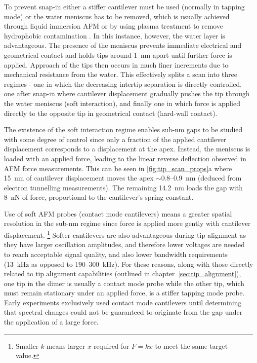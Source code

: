 \documentclass[a4paper]{article}
\begin{document}
To prevent snap-in either a stiffer cantilever must be used (normally in tapping mode) \cite{zhong1993fractured} or the water meniscus has to be removed, which is usually achieved through liquid immersion AFM \cite{hansma1994tapping, putman1994tapping, song2014} or by using plasma treatment to remove hydrophobic contamination \cite{song2014}. In this instance, however, the water layer is advantageous. The presence of the meniscus prevents immediate electrical and geometrical contact and holds tips around \SI{1}{nm} apart until further force is applied. Approach of the tips then occurs in much finer increments due to mechanical resistance from the water. This effectively splits a scan into three regimes - one in which the decreasing intertip separation is directly controlled, one after snap-in where cantilever displacement gradually pushes the tip through the water meniscus (soft interaction), and finally one in which force is applied directly to the opposite tip in geometrical contact (hard-wall contact).

The existence of the soft interaction regime enables sub-nm gaps to be studied with some degree of control since only a fraction of the applied cantilever displacement corresponds to a displacement at the apex. Instead, the meniscus is loaded with an applied force, leading to the linear reverse deflection observed in AFM force measurements. This can be seen in \autoref{fig:tip_scan_props}a where \SI{15}{nm} of cantilever displacement moves the apex $\sim$0.8--\SI{0.9}{nm} (deduced from electron tunnelling measurements). The remaining \SI{14.2}{nm} loads the gap with \SI{8}{nN} of force, proportional to the cantilever's spring constant.

Use of soft AFM probes (contact mode cantilevers) means a greater spatial resolution in the sub-nm regime since force is applied more gently with cantilever displacement.%
\footnote{Smaller $k$ means larger $x$ required for $F=kx$ to meet the same target value.}
Softer cantilevers are also advantageous during tip alignment as they have larger oscillation amplitudes, and therefore lower voltages are needed to reach acceptable signal quality, and also lower bandwidth requirements (\SI{13}{kHz} as opposed to 190--\SI{300}{kHz}).
For these reasons, along with those directly related to tip alignment capabilities (outlined in chapter~\ref{sec:tip_alignment}), one tip in the dimer is usually a contact mode probe while the other tip, which must remain stationary under an applied force, is a stiffer tapping mode probe. Early experiments exclusively used contact mode cantilevers until determining that spectral changes could not be guaranteed to originate from the gap under the application of a large force.
\end{document}
